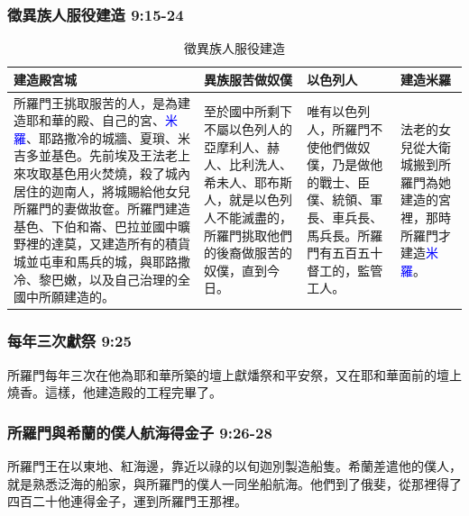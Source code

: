 \subsubsection{徵異族人服役建造 9:15-24}
\begin{table}[H]
\vspace{-3mm}
\centering 
\begin{tabular}{p{}|p{3.75cm}|p{}|p{1.85cm}}\hline\hline
建造殿宮城&異族服苦做奴僕&以色列人&建造米羅\\\hline\hline
所羅門王挑取服苦的人，是為建造耶和華的殿、自己的宮、\textcolor{blue}{米羅}、耶路撒冷的城牆、夏瑣、米吉多並基色。先前埃及王法老上來攻取基色用火焚燒，殺了城內居住的迦南人，將城賜給他女兒所羅門的妻做妝奩。所羅門建造基色、下伯和崙、巴拉並國中曠野裡的達莫，又建造所有的積貨城並屯車和馬兵的城，與耶路撒冷、黎巴嫩，以及自己治理的全國中所願建造的。
&至於國中所剩下不屬以色列人的亞摩利人、赫人、比利洗人、希未人、耶布斯人，就是以色列人不能滅盡的，所羅門挑取他們的後裔做服苦的奴僕，直到今日。
&唯有以色列人，所羅門不使他們做奴僕，乃是做他的戰士、臣僕、統領、軍長、車兵長、馬兵長。所羅門有五百五十督工的，監管工人。
&法老的女兒從大衛城搬到所羅門為她建造的宮裡，那時所羅門才建造\textcolor{blue}{米羅}。\\\hline
\end{tabular}
\caption{徵異族人服役建造}
\end{table}



\subsubsection{每年三次獻祭 9:25}
所羅門每年三次在他為耶和華所築的壇上獻燔祭和平安祭，又在耶和華面前的壇上燒香。這樣，他建造殿的工程完畢了。

\subsubsection{所羅門與希蘭的僕人航海得金子 9:26-28}
所羅門王在以東地、紅海邊，靠近以祿的以旬迦別製造船隻。希蘭差遣他的僕人，就是熟悉泛海的船家，與所羅門的僕人一同坐船航海。他們到了俄斐，從那裡得了四百二十他連得金子，運到所羅門王那裡。

	 
